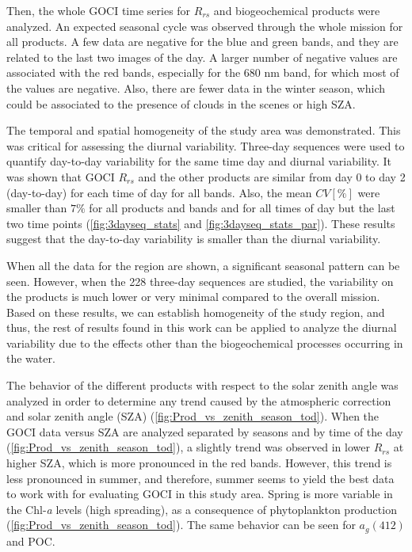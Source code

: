 \documentclass[onecolumn,3p,letterpaper,11pt]{elsarticle}
\begin{document}
Then, the whole GOCI time series for $R_{rs}$ and biogeochemical products were analyzed. 
An expected seasonal cycle was observed through the whole mission for all products. 
A few data are negative for the blue and green bands, and they are related to the last two images of the day.
A larger number of negative values are associated with the red bands, especially for the 680 nm band, for which most of the values are negative.
Also, there are fewer data in the winter season, which could be associated to the presence of clouds in the scenes or high SZA.

The temporal and spatial homogeneity of the study area was demonstrated. 
This was critical for assessing the diurnal variability. 
Three-day sequences were used to quantify day-to-day variability for the same time day and diurnal variability. It was shown that GOCI $R_{rs}$ and the other products are similar from day 0 to day 2 (day-to-day) for each time of day for all bands. 
Also, the mean $CV[\%]$ were smaller than $7\%$ for all products and bands and for all times of day but the last two time points (\autoref{fig:3dayseq_stats} and \autoref{fig:3dayseq_stats_par}). 
These results suggest that the day-to-day variability is smaller than the diurnal variability. 

When all the data for the region are shown, a significant seasonal pattern can be seen. 
However, when the 228 three-day sequences are studied, the variability on the products is much lower or very minimal compared to the overall mission. 
Based on these results, we can establish homogeneity of the study region, and thus, the rest of results found in this work can be applied to analyze the diurnal variability due to the effects other than the biogeochemical processes occurring in the water.

The behavior of the different products with respect to the solar zenith angle was analyzed in order to determine any trend caused by the atmospheric correction and solar zenith angle (SZA) (\autoref{fig:Prod_vs_zenith_season_tod}).
When the GOCI data versus SZA are analyzed separated by seasons and by time of the day (\autoref{fig:Prod_vs_zenith_season_tod}), a slightly trend was observed in lower $R_{rs}$ at higher SZA, which is more pronounced in the red bands. 
However, this trend is less pronounced in summer, and therefore, summer seems to yield the best data to work with for evaluating GOCI in this study area.
Spring is more variable in the Chl-{\it a} levels (high spreading), as a consequence of phytoplankton production (\autoref{fig:Prod_vs_zenith_season_tod}). 
The same behavior can be seen for $a_g(412)$ and POC. 
\end{document}
